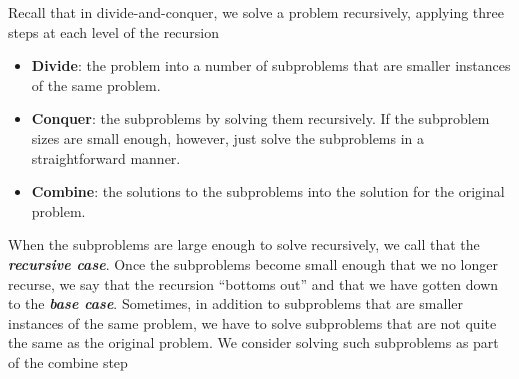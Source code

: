 \documentclass{report}
\begin{document}
        \pagebreak 
        \bigbreak \noindent 
        Recall that in divide-and-conquer, we solve a problem recursively, applying three steps at each level of the recursion
        \begin{itemize}
            \item \textbf{Divide}: the problem into a number of subproblems that are smaller instances of the same problem.
            \item \textbf{Conquer}: the subproblems by solving them recursively. If the subproblem sizes are small enough, however, just solve the subproblems in a straightforward manner.
            \item \textbf{Combine}: the solutions to the subproblems into the solution for the original problem.
        \end{itemize}
        \bigbreak \noindent 
        When the subproblems are large enough to solve recursively, we call that the \textbf{\textit{recursive case}}. Once the subproblems become small enough that we no longer recurse, we say that the recursion “bottoms out” and that we have gotten down to the \textbf{\textit{base case}}. Sometimes, in addition to subproblems that are smaller instances of the same problem, we have to solve subproblems that are not quite the same as the original problem. We consider solving such subproblems as part of the combine step
        \bigbreak \noindent 
\end{document}
